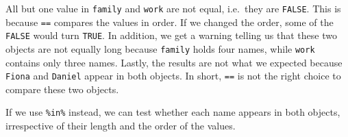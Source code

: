\documentclass[
]{book}
\newenvironment{Shaded}{\begin{snugshade}}{\end{snugshade}}
\newcommand{\AttributeTok}[1]{\textcolor[rgb]{0.77,0.63,0.00}{#1}}
\newcommand{\CommentTok}[1]{\textcolor[rgb]{0.56,0.35,0.01}{\textit{#1}}}
\newcommand{\DocumentationTok}[1]{\textcolor[rgb]{0.56,0.35,0.01}{\textbf{\textit{#1}}}}
\newcommand{\FunctionTok}[1]{\textcolor[rgb]{0.00,0.00,0.00}{#1}}
\newcommand{\NormalTok}[1]{#1}
\newcommand{\OtherTok}[1]{\textcolor[rgb]{0.56,0.35,0.01}{#1}}
\newcommand{\SpecialCharTok}[1]{\textcolor[rgb]{0.00,0.00,0.00}{#1}}
\newcommand{\StringTok}[1]{\textcolor[rgb]{0.31,0.60,0.02}{#1}}
\begin{document}
\begin{Shaded}
\end{Shaded}

All but one value in \texttt{family} and \texttt{work} are not equal, i.e.~they are \texttt{FALSE}. This is because \texttt{==} compares the values in order. If we changed the order, some of the \texttt{FALSE} would turn \texttt{TRUE}. In addition, we get a warning telling us that these two objects are not equally long because \texttt{family} holds four names, while \texttt{work} contains only three names. Lastly, the results are not what we expected because \texttt{Fiona} and \texttt{Daniel} appear in both objects. In short, \texttt{==} is not the right choice to compare these two objects.

If we use \texttt{\%in\%} instead, we can test whether each name appears in both objects, irrespective of their length and the order of the values.

\begin{Shaded}
\end{Shaded}
\end{document}
